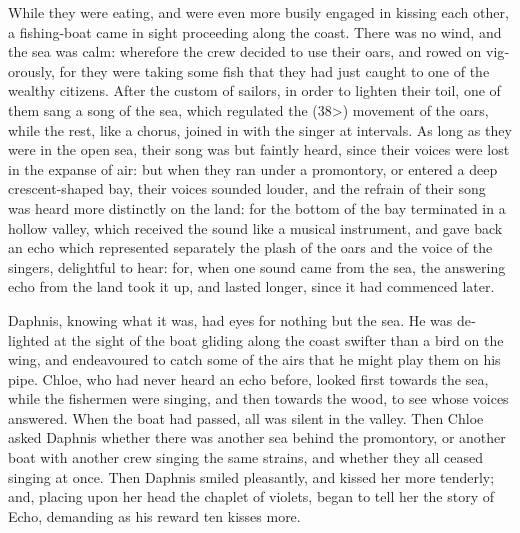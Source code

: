 \documentclass{book}
\begin{document}
\begin{pairs}
\begin{Rightside}
\begin{english}
  While they were eating, and were even more busily engaged in kissing each other, a fishing-boat came in sight proceeding along the coast.  There was no wind, and the sea was calm: wherefore the crew decided to use their oars, and rowed on vigorously, for they were taking some fish that they had just caught to one of the wealthy citizens.  After the custom of sailors, in order to lighten their toil, one of them sang a song of the sea, which regulated the (38>) movement of the oars, while the rest, like a chorus, joined in with the singer at intervals.  As long as they were in the open sea, their song was but faintly heard, since their voices were lost in the expanse of air: but when they ran under a promontory, or entered a deep crescent-shaped bay, their voices sounded louder, and the refrain of their song was heard more distinctly on the land: for the bottom of the bay terminated in a hollow valley, which received the sound like a musical instrument, and gave back an echo which represented separately the plash of the oars and the voice of the singers, delightful to hear: for, when one sound came from the sea, the answering echo from the land took it up, and lasted longer, since it had commenced later.
\pend


  Daphnis, knowing what it was, had eyes for nothing but the sea.  He was delighted at the sight of the boat gliding along the coast swifter than a bird on the wing, and endeavoured to catch some of the airs that he might play them on his pipe.  Chloe, who had never heard an echo before, looked first towards the sea, while the fishermen were singing, and then towards the wood, to see whose voices answered.  When the boat had passed, all was silent in the valley.  Then Chloe asked Daphnis whether there was another sea behind the promontory, or another boat with another crew singing the same strains, and whether they all ceased singing at once.  Then Daphnis smiled pleasantly, and kissed her more tenderly; and, placing upon her head the chaplet of violets, began to tell her the story of Echo, demanding as his reward ten kisses more.
\pend



\end{english}
\end{Rightside}
\end{pairs}
\end{document}
